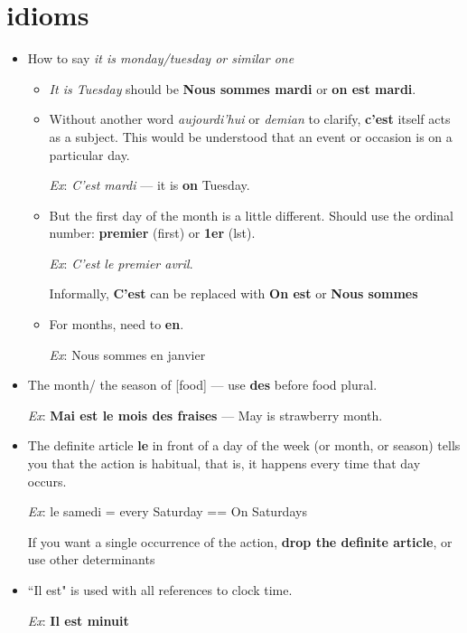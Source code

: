 \documentclass[a4paper,12pt]{article}
\begin{document}
\section{idioms}
\begin{itemize}
	\item How to say \textit{it is monday/tuesday or similar one}
	\begin{itemize}
		\item \textit{It is Tuesday} should be \textbf{Nous sommes mardi} or \textbf{on est mardi}.
		\item Without another word \textit{aujourdi'hui} or \textit{demian} to clarify, \textbf{c'est} itself acts as a subject. This would be understood that an event or occasion is on a particular day.
		\par
		\textit{Ex}: \textit{C'est mardi} --- it is \textbf{on} Tuesday.
		\item But the first day of the month is a little different. Should use the ordinal number: \textbf{premier} (first) or \textbf{1er} (lst).
		\par
		\textit{Ex}: \textit{C'est le premier avril}.
		\par
		Informally, \textbf{C'est} can be replaced with \textbf{On est} or \textbf{Nous sommes}
		\item For months, need to \textbf{en}.
		\par
		\textit{Ex}: Nous sommes en janvier
	\end{itemize}
	\item The month/ the season of [food] --- use \textbf{des} before food plural.
	\par
	\textit{Ex}: \textbf{Mai est le mois des fraises} --- May is strawberry month.
	\item The definite article \textbf{le} in front of a day of the week (or month, or season) tells you that the action is habitual, that is, it happens every time that day occurs.
	\par
	\textit{Ex}: le samedi = every Saturday == On Saturdays
	\par
	If you want a single occurrence of the action, \textbf{drop the definite article}, or use other determinants
	
	\item  ``Il est" is used with all references to clock time.
	\par
	\textit{Ex}: \textbf{Il est minuit}
	

\end{itemize}
\end{document}
